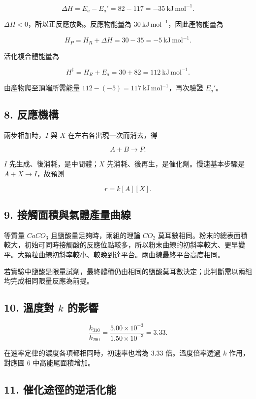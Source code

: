 \documentclass[11pt,a4paper]{article}
\begin{document}
\[
\Delta H=E_a-E_a'=82-117=-35\ \mathrm{kJ\,mol^{-1}}.
\]

\(\Delta H<0\)，所以正反應放熱。反應物能量為 \(30\ \mathrm{kJ\,mol^{-1}}\)，因此產物能量為

\[
H_P=H_R+\Delta H=30-35=-5\ \mathrm{kJ\,mol^{-1}}.
\]

活化複合體能量為

\[
H^\ddagger=H_R+E_a=30+82=112\ \mathrm{kJ\,mol^{-1}}.
\]

由產物爬至頂端所需能量 \(112-(-5)=117\ \mathrm{kJ\,mol^{-1}}\)，再次驗證 \(E_a'\)。

\subsection{8. 反應機構}\label{ux53cdux61c9ux6a5fux69cb}

兩步相加時，\(I\) 與 \(X\) 在左右各出現一次而消去，得

\[
A+B\longrightarrow P.
\]

\(I\) 先生成、後消耗，是中間體；\(X\) 先消耗、後再生，是催化劑。慢速基本步驟是 \(A+X\rightarrow I\)，故預測

\[
r=k[A][X].
\]

\subsection{9. 接觸面積與氣體產量曲線}\label{ux63a5ux89f8ux9762ux7a4dux8207ux6c23ux9ad4ux7522ux91cfux66f2ux7dda}

等質量 \(CaCO_3\) 且鹽酸量足夠時，兩組的理論 \(CO_2\) 莫耳數相同。粉末的總表面積較大，初始可同時接觸酸的反應位點較多，所以粉末曲線的初斜率較大、更早變平。大顆粒曲線初斜率較小、較晚到達平台。兩曲線最終平台高度相同。

若實驗中鹽酸是限量試劑，最終體積仍由相同的鹽酸莫耳數決定；此判斷需以兩組均完成相同限量反應為前提。

\subsection{\texorpdfstring{10. 溫度對 \(k\) 的影響}{10. 溫度對 k 的影響}}\label{ux6eabux5ea6ux5c0d-k-ux7684ux5f71ux97ff}

\[
\frac{k_{310}}{k_{290}}
=\frac{5.00\times10^{-3}}{1.50\times10^{-3}}
=3.33.
\]

在速率定律的濃度各項都相同時，初速率也增為 \(3.33\) 倍。溫度倍率透過 \(k\) 作用，對應圖 6 中高能尾面積增加。

\subsection{11. 催化途徑的逆活化能}\label{ux50acux5316ux9014ux5f91ux7684ux9006ux6d3bux5316ux80fd}
\end{document}
